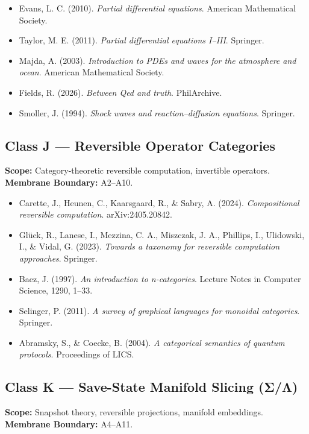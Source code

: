 \begin{itemize}
  \item Evans, L. C. (2010). \textit{Partial differential equations}. American Mathematical Society.
  \item Taylor, M. E. (2011). \textit{Partial differential equations I–III}. Springer.
  \item Majda, A. (2003). \textit{Introduction to PDEs and waves for the atmosphere and ocean}. American Mathematical Society.
  \item Fields, R. (2026). \textit{Between Qed and truth}. PhilArchive.
  \item Smoller, J. (1994). \textit{Shock waves and reaction–diffusion equations}. Springer.
\end{itemize}

\subsection*{Class J — Reversible Operator Categories}
\textbf{Scope:} Category-theoretic reversible computation, invertible operators. \\
\textbf{Membrane Boundary:} A2–A10.

\begin{itemize}
  \item Carette, J., Heunen, C., Kaarsgaard, R., \& Sabry, A. (2024). \textit{Compositional reversible computation}. arXiv:2405.20842.
  \item Glück, R., Lanese, I., Mezzina, C. A., Miszczak, J. A., Phillips, I., Ulidowski, I., \& Vidal, G. (2023). \textit{Towards a taxonomy for reversible computation approaches}. Springer.
  \item Baez, J. (1997). \textit{An introduction to n-categories}. Lecture Notes in Computer Science, 1290, 1–33.
  \item Selinger, P. (2011). \textit{A survey of graphical languages for monoidal categories}. Springer.
  \item Abramsky, S., \& Coecke, B. (2004). \textit{A categorical semantics of quantum protocols}. Proceedings of LICS.
\end{itemize}

\subsection*{Class K — Save-State Manifold Slicing (Σ/Λ)}
\textbf{Scope:} Snapshot theory, reversible projections, manifold embeddings. \\
\textbf{Membrane Boundary:} A4–A11.

